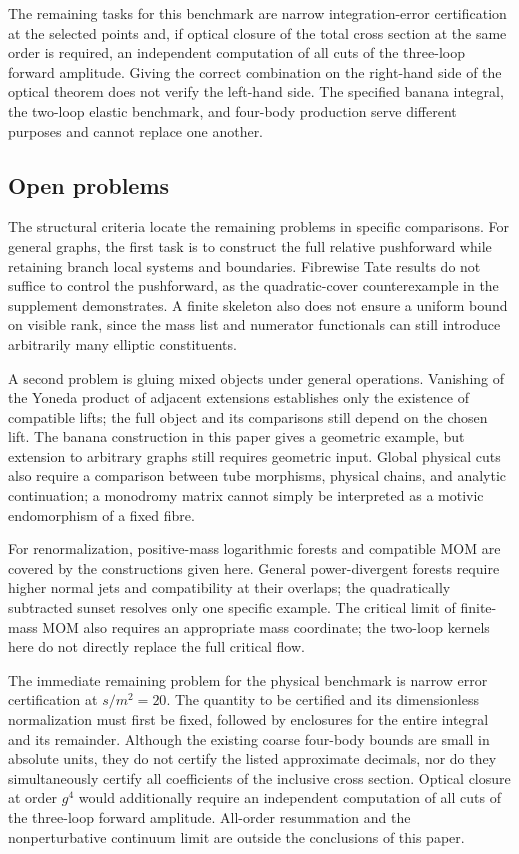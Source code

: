 \documentclass[11pt,a4paper,oneside]{article}
\theoremstyle{plain}
\theoremstyle{definition}
\theoremstyle{remark}
\numberwithin{equation}{section}
\begin{document}
The remaining tasks for this benchmark are narrow integration-error certification at the selected points and, if optical closure of the total cross section at the same order is required, an independent computation of all cuts of the three-loop forward amplitude. Giving the correct combination on the right-hand side of the optical theorem does not verify the left-hand side. The specified banana integral, the two-loop elastic benchmark, and four-body production serve different purposes and cannot replace one another.



\endgroup
\subsection{Open problems}\label{ch:roadmap}
The structural criteria locate the remaining problems in specific comparisons. For general graphs, the first task is to construct the full relative pushforward while retaining branch local systems and boundaries. Fibrewise Tate results do not suffice to control the pushforward, as the quadratic-cover counterexample in the supplement demonstrates. A finite skeleton also does not ensure a uniform bound on visible rank, since the mass list and numerator functionals can still introduce arbitrarily many elliptic constituents.

A second problem is gluing mixed objects under general operations. Vanishing of the Yoneda product of adjacent extensions establishes only the existence of compatible lifts; the full object and its comparisons still depend on the chosen lift. The banana construction in this paper gives a geometric example, but extension to arbitrary graphs still requires geometric input. Global physical cuts also require a comparison between tube morphisms, physical chains, and analytic continuation; a monodromy matrix cannot simply be interpreted as a motivic endomorphism of a fixed fibre.

For renormalization, positive-mass logarithmic forests and compatible MOM are covered by the constructions given here. General power-divergent forests require higher normal jets and compatibility at their overlaps; the quadratically subtracted sunset resolves only one specific example. The critical limit of finite-mass MOM also requires an appropriate mass coordinate; the two-loop kernels here do not directly replace the full critical flow.

The immediate remaining problem for the physical benchmark is narrow error certification at $s/m^2=20$. The quantity to be certified and its dimensionless normalization must first be fixed, followed by enclosures for the entire integral and its remainder. Although the existing coarse four-body bounds are small in absolute units, they do not certify the listed approximate decimals, nor do they simultaneously certify all coefficients of the inclusive cross section. Optical closure at order $g^4$ would additionally require an independent computation of all cuts of the three-loop forward amplitude. All-order resummation and the nonperturbative continuum limit are outside the conclusions of this paper.
\end{document}
